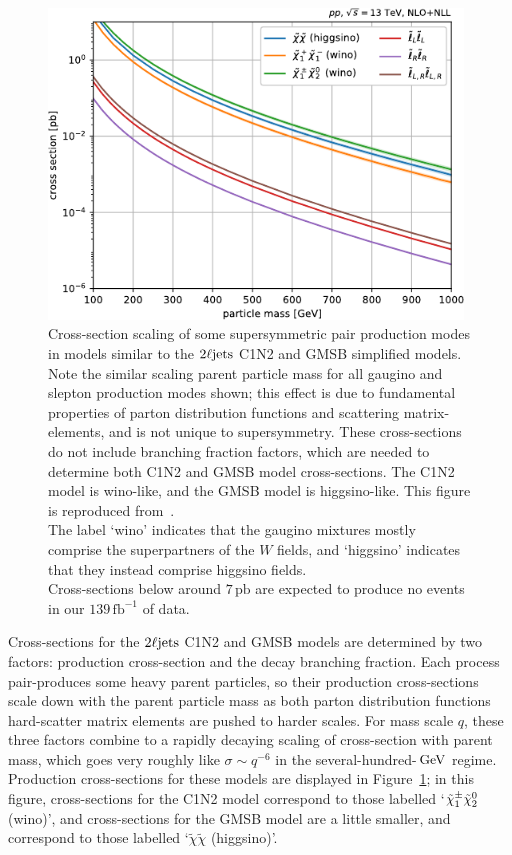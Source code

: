 \begin{figure}[tp]
\centering
\includegraphics[width=0.98\textwidth]{figures/theory_pdg_susy_xsec.pdf}
\caption[
Cross-section scaling of some supersymmetric pair production modes
]{%
Cross-section scaling of some supersymmetric pair production modes
in models similar to the $\twoljets$ C1N2 and GMSB simplified models.
Note the similar scaling parent particle mass  for all gaugino and slepton
production modes shown;
this effect is due to fundamental properties of parton distribution functions
and scattering matrix-elements, and is not unique to supersymmetry.
These cross-sections do not include branching fraction factors, which are
needed to determine both C1N2 and GMSB model cross-sections.
The C1N2 model is wino-like, and the GMSB model is higgsino-like.
This figure is reproduced from~\cite{pdg2022ynf}.
\\[0.4em]
The label `wino' indicates that the gaugino mixtures mostly comprise the
superpartners of the $W$ fields, and `higgsino' indicates that they instead
comprise higgsino fields.
\\[0.4em]
Cross-sections below around $7\,\mathrm{pb}$ are expected to produce no
events in our $139\,\mathrm{fb}^{-1}$ of data.
}
\label{fig:theory_susy_xs}
\end{figure}

Cross-sections for the $\twoljets$ C1N2 and GMSB models are determined by two
factors: production cross-section and the decay branching fraction.
Each process pair-produces some heavy parent particles, so their production
cross-sections scale down with the parent particle mass
as both parton distribution functions hard-scatter matrix elements
are pushed to harder scales.
For mass scale $q$, these three factors combine to a rapidly decaying scaling
of cross-section with parent mass, which goes very roughly like
$\sigma \sim q^{-6}$ in the several-hundred-$\,\eV[G]$ regime.
Production cross-sections for these models are displayed in
Figure~\ref{fig:theory_susy_xs};
in this figure,
cross-sections for the C1N2 model correspond to those labelled
`$\chargino_1 \neutralino_2$ (wino)', and
cross-sections for the GMSB model are a little smaller, and correspond to those
labelled `$\tilde \chi \tilde \chi$ (higgsino)'.

